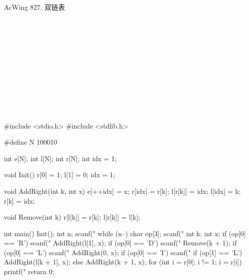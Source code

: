 \begin{titledbox}{AcWing 827. 双链表}
    \begin{inputblock}
         \\
         \\
         \\
         \\
         \\
         \\
         \\
         \\
         \\
         \\
    \end{inputblock}
    \begin{outputblock}
    \end{outputblock}
\end{titledbox}

\begin{mycpptwocol}[双链表]
    #include <stdio.h>
    #include <stdlib.h>

    #define N 100010

    int e[N];
    int l[N];
    int r[N];
    int idx = 1;

    void Init() {
        r[0] = 1;
        l[1] = 0;
        idx = 1;
    }

    void AddRight(int k, int x) {
        e[++idx] = x;
        r[idx] = r[k];
        l[r[k]] = idx;
        l[idx] = k;
        r[k] = idx;
    }

    void Remove(int k) {
        r[l[k]] = r[k];
        l[r[k]] = l[k];
    }

    int main() {
        Init();
        int n;
        scanf("%
        while (n--) {
            char op[3];
            scanf("%
            int k;
            int x;
            if (op[0] == 'R') {
                scanf("%
                AddRight(l[1], x);
            }
            if (op[0] == 'D') {
                scanf("%
                Remove(k + 1);
            }
            if (op[0] == 'L') {
                scanf("%
                AddRight(0, x);
            }
            if (op[0] == 'I') {
                scanf("%
                if (op[1] == 'L') {
                    AddRight(l[k + 1], x);
                } else {
                    AddRight(k + 1, x);
                }
            }
        }
        for (int i = r[0]; i != 1; i = r[i]) {
            printf("%
        }
        return 0;
    }
\end{mycpptwocol}


